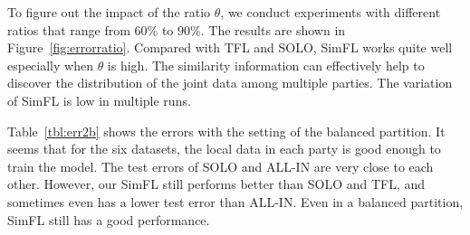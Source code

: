 \documentclass[letterpaper]{article} %
\theoremstyle{definition}
\begin{document}
\begin{table}
\centering
\caption{The test errors of different approaches (balanced partition)}
\label{tbl:err2b}
\end{table}

To figure out the impact of the ratio $\theta$, we conduct experiments with different ratios that range from $60\%$ to $90\%$. The results are shown in Figure~\ref{fig:errorratio}. Compared with TFL and SOLO, SimFL works quite well especially when $\theta$ is high. The similarity information can effectively help to discover the distribution of the joint data among multiple parties. The variation of SimFL is low in multiple runs. 

Table~\ref{tbl:err2b} shows the errors with the setting of the balanced partition. It seems that for the six datasets, the local data in each party is good enough to train the model. The test errors of SOLO and ALL-IN are very close to each other. However, our SimFL still performs better than SOLO and TFL, and sometimes even has a lower test error than ALL-IN. Even in a balanced partition, SimFL still has a good performance.
\end{document}
